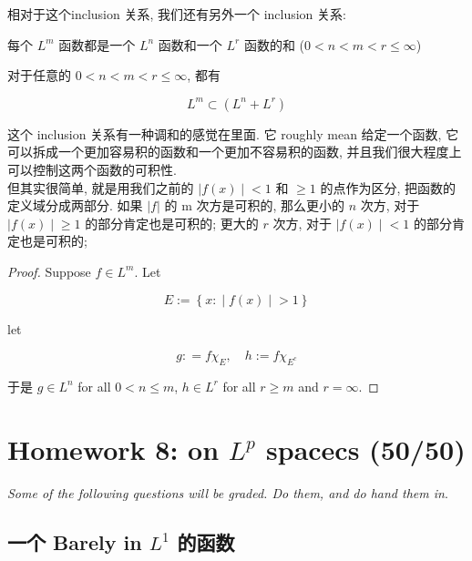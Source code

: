\documentclass{qlnotes-export}
\begin{document}
相对于这个inclusion 关系, 我们还有另外一个 inclusion 关系:

\begin{proposition}{每个 \(L^{m}\) 函数都是一个 \(L^{n}\) 函数和一个 \(L^{r}\) 函数的和
(\(0 < n < m < r \leq \infty\))}\label{prop-09-l-p-space-and-inequalities-l-m-l-n-l-r-0-n-m-r-leq-infty}

对于任意的 \(0 < n < m < r \leq \infty\), 都有

\[L^{m} \subset (L^{n} + L^{r})\]

\end{proposition}

这个 inclusion 关系有一种调和的感觉在里面. 它 roughly mean 给定一个函数, 它可以拆成一个更加容易积的函数和一个更加不容易积的函数, 并且我们很大程度上可以控制这两个函数的可积性.\\
但其实很简单, 就是用我们之前的 \(\left. |f(x) \middle| < 1 \right.\) 和 \(\geq 1\) 的点作为区分, 把函数的定义域分成两部分. 如果 \(|f|\) 的 m 次方是可积的, 那么更小的 \(n\) 次方, 对于 \(\left. |f(x) \middle| \geq 1 \right.\) 的部分肯定也是可积的; 更大的 \(r\) 次方, 对于 \(\left. |f(x) \middle| < 1 \right.\) 的部分肯定也是可积的;

\begin{proof}

Suppose \(f \in L^{m}\). Let

\[E := \left\{ x: \middle| f(x) \middle| > 1 \right\}\]

let

\[g: = f\chi_{E},\quad h := f\chi_{E^{c}}\]

于是 \(g \in L^{n}\) for all \(0 < n \leq m\), \(h \in L^{r}\) for all \(r \geq m\) and \(r = \infty\).

\end{proof}

\chapter{\texorpdfstring{Homework 8: on \(L^{p}\) spacecs (50/50)}{Homework 8: on L\^{}\{p\} spacecs (50/50)}}\label{homework-8-on-lp-spacecs-5050}

\emph{Some of the following questions will be graded. Do them, and do hand them in}.

\section{\texorpdfstring{一个 Barely in \(L^{1}\) 的函数}{一个 Barely in L\^{}\{1\} 的函数}}\label{ux4e00ux4e2a-barely-in-l1-ux7684ux51fdux6570}
\end{document}
